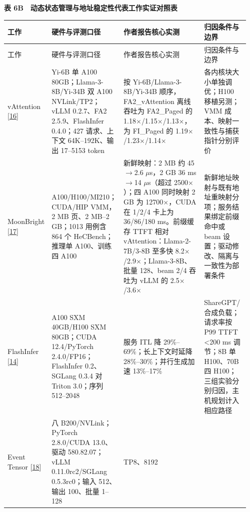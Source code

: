 \documentclass[UTF8,10.5pt,fontset=windows]{ctexart}
\newcommand{\TableTitle}[1]{\par\Needspace{5\baselineskip}\begingroup\centering\bfseries\fontsize{9.5}{13}\selectfont #1\par\endgroup\nobreak}
\begin{document}
\begin{landscape}
\begingroup
\fontsize{8.6}{11.8}\selectfont
\setlength{\tabcolsep}{2.5pt}
\setlength{\emergencystretch}{0.5\linewidth}
\renewcommand{\arraystretch}{1.10}
\TableTitle{\textbf{表 6B　动态状态管理与地址稳定性代表工作实证对照表}}
\begin{longtable}[c]{@{}>{\raggedright\arraybackslash}p{0.1536\linewidth}
>{\raggedright\arraybackslash}p{0.2496\linewidth}
>{\raggedright\arraybackslash}p{0.3648\linewidth}
>{\raggedright\arraybackslash}p{0.1920\linewidth}@{}}
\toprule
工作 & 硬件与评测口径 & 作者报告核心实测 & 归因条件与边界 \\
\midrule\endfirsthead
\toprule
工作 & 硬件与评测口径 & 作者报告核心实测 & 归因条件与边界 \\
\midrule\endhead
\bottomrule\endfoot
\bottomrule\endlastfoot
vAttention {[}\protect\hyperlink{ref-prabhu2025vattention}{16}{]} &
Yi-6B 单 A100 80GB；Llama-3-8B/Yi-34B 双 A100 NVLink/TP2；vLLM
0.2.7、FA2 2.5.9、FlashInfer 0.4.0；427 请求、上下文 64K--192K、输出
17--5153 token & 按 Yi-6B/Llama-3-8B/Yi-34B 顺序，FA2\_vAttention
离线吞吐为 FA2\_Paged 的 1.18\(\times\)/1.15\(\times\)/1.13\(\times\)，为 FI\_Paged 的
1.19\(\times\)/1.23\(\times\)/1.14\(\times\) & 各内核块大小单独调优；H100 移植另测；VMM
成本、映射一致性与捕获指针分别评价 \\
MoonBright {[}\protect\hyperlink{ref-zhang2026moonbright}{17}{]} &
A100/H100/MI210；CUDA/HIP VMM，2 MB 页、2 MB--2 GB；1013 用例含 864 个
HeCBench；推理单 A100、训练四 A100 & 新鲜映射：2 MB 约 45\(\rightarrow\)2.6 \(\mu\)s，2 GB
36 ms\(\rightarrow\)14 \(\mu\)s（超过 2500\(\times\)）；四 A100 同时映射 2 GB 为 12700\(\times\)，CUDA 在
1/2/4 卡上为 36/86/180 ms。前缀缓存 TTFT 相对
vAttention：Llama-2-7B/3-8B 至多快 8.2\(\times\)/2.9\(\times\)；Llama-3-8B、批量 128、beam
2/4 吞吐为 vLLM 的 2.5\(\times\)/3.6\(\times\) &
新鲜地址映射与既有地址重映射分项；服务结果绑定前缀命中或 beam
设置；驱动修改、隔离与一致性为部署条件 \\
FlashInfer {[}\protect\hyperlink{ref-ye2025flashinfer}{14}{]} & A100 SXM
40GB/H100 SXM 80GB；CUDA 12.4/PyTorch 2.4.0/FP16；FlashInfer 0.2、SGLang
0.3.4 对 Triton 3.0；序列 512--2048 & 服务 ITL 降
29\%--69\%；长上下文时延降 28\%--30\%；并行生成加速 13\%--17\% &
ShareGPT/合成负载；请求率按 P99 TTFT \textless200 ms 调节；8B 单
H100、70B 四 H100；三组实验分别归因，主机规划计入相应路径 \\
Event Tensor {[}\protect\hyperlink{ref-jin2026eventtensor}{18}{]} & 八
B200/NVLink；PyTorch 2.8.0/CUDA 13.0、驱动 580.82.07；vLLM
0.11.0rc2/SGLang 0.5.3rc0；输入 512、输出 100、批量 1--128 & TP8、8192

\end{longtable}
\end{landscape}
\end{document}
